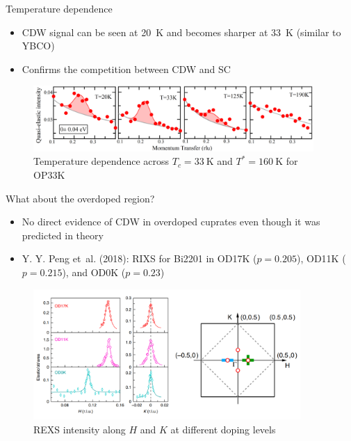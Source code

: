 \documentclass{beamer}
\begin{document}
\begin{frame}{Temperature dependence}
\begin{itemize}
\item CDW signal can be seen at 20~K and becomes sharper at 33~K (similar to YBCO)
\item Confirms the competition between CDW and SC
\end{itemize}
\begin{figure}
\includegraphics[width=4.2in]{figs/5e.png}
\caption*{Temperature dependence across $T_c = 33~\mathrm{K}$ and $T^{*} = 160~\mathrm{K}$ for OP33K}
\end{figure}
\end{frame}


\begin{frame}{What about the overdoped region?}
\begin{itemize}
\item No direct evidence of CDW in overdoped cuprates even though it was predicted in theory
\item Y. Y. Peng et~al. (2018): RIXS for Bi2201 in OD17K ($p = 0.205$), OD11K ($p = 0.215$), and OD0K ($p = 0.23$)
\end{itemize}
\begin{figure}
\includegraphics[width=4in]{figs/2018_2b.png}
\caption*{REXS intensity along $H$ and $K$ at different doping levels}
\end{figure}
\end{frame}
\end{document}
